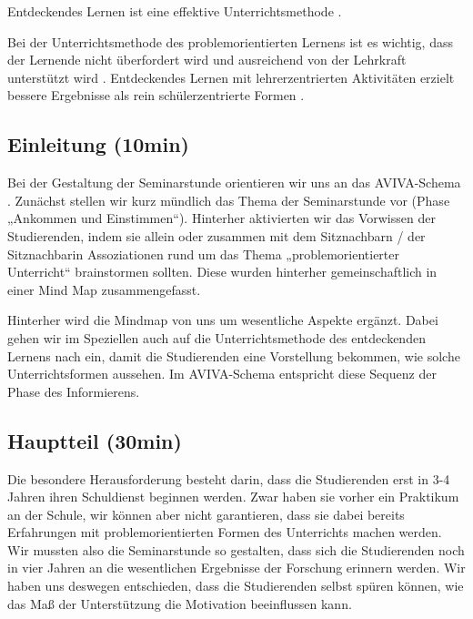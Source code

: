\documentclass[man,12pt,a4paper]{apa6}
\begin{document}
\begin{APAitemize}
  \item Entdeckendes Lernen ist eine effektive Unterrichtsmethode \parencite{furtak2012}.
  \item Bei der Unterrichtsmethode des problemorientierten Lernens ist es wichtig, dass der Lernende nicht überfordert wird und ausreichend von der Lehrkraft unterstützt wird \parencite{kunter2013}. Entdeckendes Lernen mit lehrerzentrierten Aktivitäten erzielt bessere Ergebnisse als rein schülerzentrierte Formen \parencite{furtak2012}.
\end{APAitemize}

\subsection{Einleitung (10min)}

Bei der Gestaltung der Seminarstunde orientieren wir uns an das AVIVA-Schema \parencite{aviva}. Zunächst stellen wir kurz mündlich das Thema der Seminarstunde vor (Phase „Ankommen und Einstimmen“). Hinterher aktivierten wir das Vorwissen der Studierenden, indem sie allein oder zusammen mit dem Sitznachbarn / der Sitznachbarin Assoziationen rund um das Thema „problemorientierter Unterricht“ brainstormen sollten. Diese wurden hinterher gemeinschaftlich in einer Mind Map zusammengefasst.

Hinterher wird die Mindmap von uns um wesentliche Aspekte ergänzt. Dabei gehen wir im Speziellen auch auf die Unterrichtsmethode des entdeckenden Lernens nach \textcite{hameyer2008} ein, damit die Studierenden eine Vorstellung bekommen, wie solche Unterrichtsformen aussehen. Im AVIVA-Schema entspricht diese Sequenz der Phase des Informierens.

\subsection{Hauptteil (30min)}

Die besondere Herausforderung besteht darin, dass die Studierenden erst in 3-4 Jahren ihren Schuldienst beginnen werden. Zwar haben sie vorher ein Praktikum an der Schule, wir können aber nicht garantieren, dass sie dabei bereits Erfahrungen mit problemorientierten Formen des Unterrichts machen werden. Wir mussten also die Seminarstunde so gestalten, dass sich die Studierenden noch in vier Jahren an die wesentlichen Ergebnisse der Forschung erinnern werden. Wir haben uns deswegen entschieden, dass die Studierenden selbst spüren können, wie das Maß der Unterstützung die Motivation beeinflussen kann.
\end{document}
